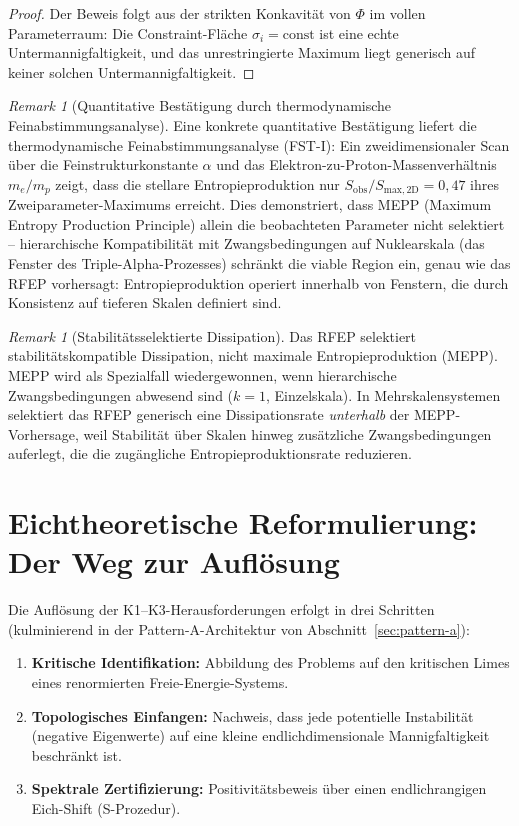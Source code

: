 \documentclass[12pt,a4paper]{article}
\theoremstyle{definition}
\theoremstyle{remark}
\newtheorem{remark}[theorem]{Remark}
\begin{document}
\begin{proof}
Der Beweis folgt aus der strikten Konkavität von $\Phi$ im vollen Parameterraum: Die Constraint-Fläche $\sigma_i = \text{const}$ ist eine echte Untermannigfaltigkeit, und das unrestringierte Maximum liegt generisch auf keiner solchen Untermannigfaltigkeit.
\end{proof}

\begin{remark}[Quantitative Bestätigung durch thermodynamische Feinabstimmungsanalyse]
\label{rem:rfep-thermo-confirmation}
Eine konkrete quantitative Bestätigung liefert die thermodynamische Feinabstimmungsanalyse (FST-I): Ein zweidimensionaler Scan über die Feinstrukturkonstante $\alpha$ und das Elektron-zu-Proton-Massenverhältnis $m_e/m_p$ zeigt, dass die stellare Entropieproduktion nur $S_{\mathrm{obs}}/S_{\mathrm{max,2D}} = 0{,}47$ ihres Zweiparameter-Maximums erreicht. Dies demonstriert, dass MEPP (Maximum Entropy Production Principle) allein die beobachteten Parameter nicht selektiert -- hierarchische Kompatibilität mit Zwangsbedingungen auf Nuklearskala (das Fenster des Triple-Alpha-Prozesses) schränkt die viable Region ein, genau wie das RFEP vorhersagt: Entropieproduktion operiert innerhalb von Fenstern, die durch Konsistenz auf tieferen Skalen definiert sind.
\end{remark}

\begin{remark}[Stabilitätsselektierte Dissipation]
\label{rem:stability-dissipation}
Das RFEP selektiert stabilitätskompatible Dissipation, nicht maximale Entropieproduktion (MEPP). MEPP wird als Spezialfall wiedergewonnen, wenn hierarchische Zwangsbedingungen abwesend sind ($k=1$, Einzelskala). In Mehrskalensystemen selektiert das RFEP generisch eine Dissipationsrate \emph{unterhalb} der MEPP-Vorhersage, weil Stabilität über Skalen hinweg zusätzliche Zwangsbedingungen auferlegt, die die zugängliche Entropieproduktionsrate reduzieren.
\end{remark}

\section{Eichtheoretische Reformulierung: Der Weg zur Auflösung}

Die Auflösung der K1--K3-Herausforderungen erfolgt in drei Schritten (kulminierend in der Pattern-A-Architektur von Abschnitt~\ref{sec:pattern-a}):
\begin{enumerate}
    \item \textbf{Kritische Identifikation:} Abbildung des Problems auf den kritischen Limes eines renormierten Freie-Energie-Systems.
    \item \textbf{Topologisches Einfangen:} Nachweis, dass jede potentielle Instabilität (negative Eigenwerte) auf eine kleine endlichdimensionale Mannigfaltigkeit beschränkt ist.
    \item \textbf{Spektrale Zertifizierung:} Positivitätsbeweis über einen endlichrangigen Eich-Shift (S-Prozedur).
\end{enumerate}
\end{document}
